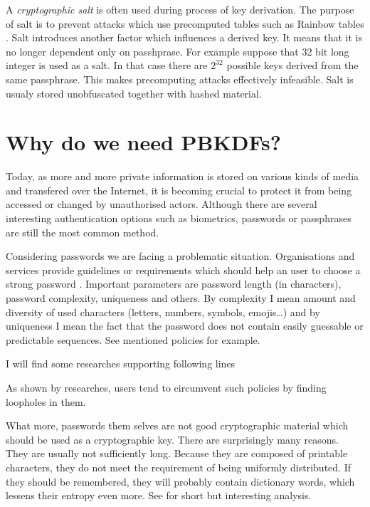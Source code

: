 \documentclass[nolof]{fithesis3}
\begin{document}
A \emph{cryptographic salt} is often used during process of key derivation. The purpose of salt is to prevent attacks which use precomputed tables such as Rainbow tables \parencite{rainbowtables}. Salt introduces another factor which influences a derived key. It means that it is no longer dependent only on passhprase. For example suppose that 32 bit long integer is used as a salt. In that case there are \(2^{32}\) possible keys derived from the same passphrase. This makes precomputing attacks effectively infeasible. Salt is usualy stored unobfuscated together with hashed material.

\section{Why do we need PBKDFs?}
\label{whypbkdfs}
Today, as more and more private information is stored on various kinds of media and transfered over the Internet, it is becoming crucial to protect it from being accessed or changed by unauthorised actors. Although there are several interesting authentication options such as biometrics, passwords or passphrases are still the most common method.

Considering passwords we are facing a problematic situation. Organisations and services provide guidelines or requirements which should help an user to choose a strong password \parencite{nistpasswords} \parencite{sanspasswordguidelines}. Important parameters are password length (in characters), password complexity, uniqueness and others. By complexity I mean amount and diversity of used characters (letters, numbers, symbols, emojis\dots) and by uniqueness I mean the fact that the password does not contain easily guessable or predictable sequences. See mentioned policies for example.

I will find some researches supporting following lines

As shown by researches, users tend to circumvent such policies by finding loopholes in them. %

What more, passwords them selves are not good cryptographic material which should be used as a cryptographic key. There are surprisingly many reasons. They are usually not sufficiently long. Because they are composed of printable characters, they do not meet the requirement of being uniformly distributed. If they should be remembered, they will probably contain dictionary words, which lessens their entropy even more. See \parencite[section 5.6.4]{itmc14} for short but interesting analysis.
\end{document}
